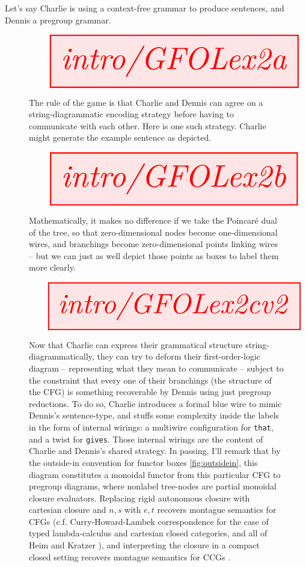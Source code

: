 \begin{example} Let's say Charlie is using a context-free grammar to produce sentences, and Dennis a pregroup grammar. \\

\begin{figure}[h!]\label{fig:GFOLex2a}
\centering
\[\resizebox{\textwidth}{!}{\tikzfig{intro/GFOLex2a}}\]
\caption{The rule of the game is that Charlie and Dennis can agree on a string-diagrammatic encoding strategy before having to communicate with each other. Here is one such strategy. Charlie might generate the example sentence as depicted.}
\end{figure}

\begin{figure}[h!]\label{fig:GFOLex2b}
\centering
\[\resizebox{\textwidth}{!}{\tikzfig{intro/GFOLex2b}}\]
\caption{Mathematically, it makes no difference if we take the Poincar\'{e} dual of the tree, so that zero-dimensional nodes become one-dimensional wires, and branchings become zero-dimensional points linking wires -- but we can just as well depict those points as boxes to label them more clearly.}
\end{figure}

\begin{figure}[h!]\label{fig:GFOLex2c}
\centering
\[\resizebox{\textwidth}{!}{\tikzfig{intro/GFOLex2cv2}}\]
\caption{Now that Charlie can express their grammatical structure string-diagrammatically, they can try to deform their first-order-logic diagram -- representing what they mean to communicate -- subject to the constraint that every one of their branchings (the structure of the CFG) is something recoverable by Dennis using just pregroup reductions. To do so, Charlie introduces a formal blue wire to mimic Dennis's sentence-type, and stuffs some complexity inside the labels in the form of internal wirings: a multiwire configuration for \texttt{that}, and a twist for \texttt{gives}. Those internal wirings are the content of Charlie and Dennis's shared strategy. In passing, I'll remark that by the outside-in convention for functor boxes \ref{fig:outsidein}, this diagram constitutes a monoidal functor from this particular CFG to pregroup diagrams, where nonlabel tree-nodes are partial monoidal closure evaluators. Replacing rigid autonomous closure with cartesian closure and $n,s$ with $e,t$ recovers montague semantics for CFGs (c.f. Curry-Howard-Lambek correspondence for the case of typed lambda-calculus and cartesian closed categories, and all of Heim and Kratzer \citep{heim_semantics_1998}), and interpreting the closure in a compact closed setting recovers montague semantics for CCGs \citep{yeung_ccg-based_2021}.}
\end{figure}


\end{example}
